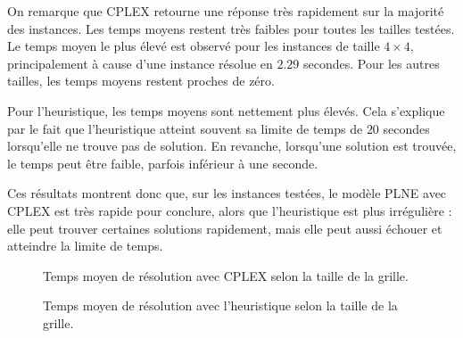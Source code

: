 On remarque que CPLEX retourne une réponse très rapidement sur la majorité des instances. Les temps moyens restent très faibles pour toutes les tailles testées. Le temps moyen le plus élevé est observé pour les instances de taille \(4 \times 4\), principalement à cause d'une instance résolue en \(2.29\) secondes. Pour les autres tailles, les temps moyens restent proches de zéro.

Pour l'heuristique, les temps moyens sont nettement plus élevés. Cela s'explique par le fait que l'heuristique atteint souvent sa limite de temps de \(20\) secondes lorsqu'elle ne trouve pas de solution. En revanche, lorsqu'une solution est trouvée, le temps peut être faible, parfois inférieur à une seconde.

Ces résultats montrent donc que, sur les instances testées, le modèle PLNE avec CPLEX est très rapide pour conclure, alors que l'heuristique est plus irrégulière : elle peut trouver certaines solutions rapidement, mais elle peut aussi échouer et atteindre la limite de temps.

\begin{figure}[H]
\centering
{}
\caption{Temps moyen de résolution avec CPLEX selon la taille de la grille.}
\end{figure}

\begin{figure}[H]
\centering
{}
\caption{Temps moyen de résolution avec l'heuristique selon la taille de la grille.}
\end{figure}


